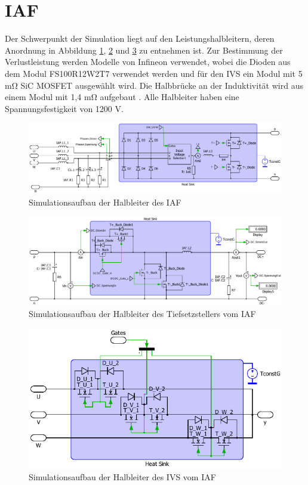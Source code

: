 \section{IAF}
	Der Schwerpunkt der Simulation liegt auf den Leistungshalbleitern, deren Anordnung in Abbildung \ref{fig:iafplecsmain}, \ref{fig:iafplecsbuck} und \ref{fig:iafplecsivs} zu entnehmen ist. Zur Bestimmung der Verlustleistung werden Modelle von Infineon verwendet, wobei die Dioden aus dem Modul FS100R12W2T7 \cite{FS100R12W2T7} verwendet werden und für den \gls{IVS} ein Modul mit 5 \si{\milli \ohm} \gls{SiC} \gls{MOSFET} ausgewählt wird. Die Halbbrücke an der Induktivität wird aus einem Modul mit 1,4 \si{\milli \ohm} aufgebaut \cite{FF4MR12W2M1H}. Alle Halbleiter haben eine Spannungsfestigkeit von 1200 V.
	\begin{figure}
		\centering
		\includegraphics[width=1\linewidth]{content/Grafiken/IAF_Plecs_main}
		\caption{Simulationsaufbau der Halbleiter des IAF}
		\label{fig:iafplecsmain}
	\end{figure}
	\begin{figure}
		\centering
		\includegraphics[width=1\linewidth]{content/Grafiken/IAF_Plecs_Buck}
		\caption{Simulationsaufbau der Halbleiter des Tiefsetzstellers vom IAF}
		\label{fig:iafplecsbuck}
	\end{figure}
	
	\begin{figure}
		\centering
		\includegraphics[width=0.7\linewidth]{content/Grafiken/IAF_Plecs_IVS}
		\caption{Simulationsaufbau der Halbleiter des IVS vom IAF}
		\label{fig:iafplecsivs}
	\end{figure}
	

